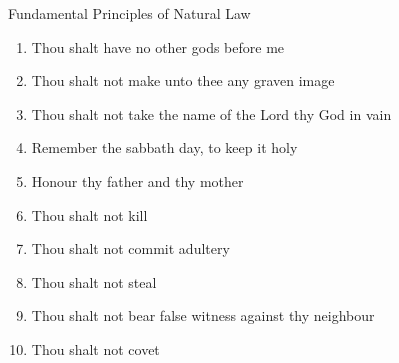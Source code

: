 \begin{frame}{Fundamental Principles of Natural Law}
    \begin{enumerate}
        \item Thou shalt have no other gods before me
        \item Thou shalt not make unto thee any graven image
        \item Thou shalt not take the name of the Lord thy God in vain
        \item Remember the sabbath day, to keep it holy
        \item Honour thy father and thy mother
        \item Thou shalt not kill
        \item Thou shalt not commit adultery
        \item Thou shalt not steal
        \item Thou shalt not bear false witness against thy neighbour
        \item Thou shalt not covet
    \end{enumerate}
\end{frame}

